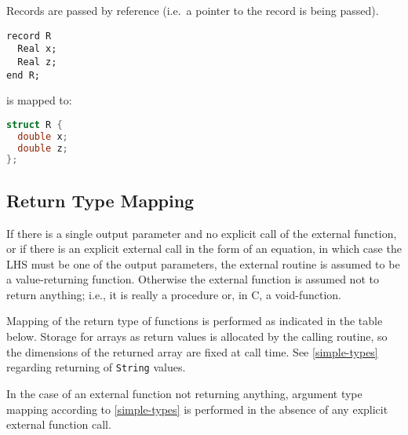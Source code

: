 Records are passed by reference (i.e.\ a pointer to the record is being
passed).

\begin{example}
\begin{lstlisting}[language=modelica]
record R
  Real x;
  Real z;
end R;
\end{lstlisting}
is mapped to:
\begin{lstlisting}[language=C]
struct R {
  double x;
  double z;
};
\end{lstlisting}
\end{example}

\subsection{Return Type Mapping}\label{return-type-mapping}

If there is a single output parameter and no explicit call of the external function, or if there is an explicit external call in the form of an equation, in which case the LHS must be one of the output parameters, the external routine is assumed to be a value-returning function.
Otherwise the external function is assumed not to return anything; i.e., it is really a procedure or, in C, a void-function.

Mapping of the return type of functions is performed as indicated in the table below.
Storage for arrays as return values is allocated by the calling routine, so the dimensions of the returned array are fixed at call time.
See \cref{simple-types} regarding returning of \lstinline!String! values.

\begin{nonnormative}
In the case of an external function not returning anything, argument type mapping according to \cref{simple-types} is performed in the absence
of any explicit external function call.
\end{nonnormative}

